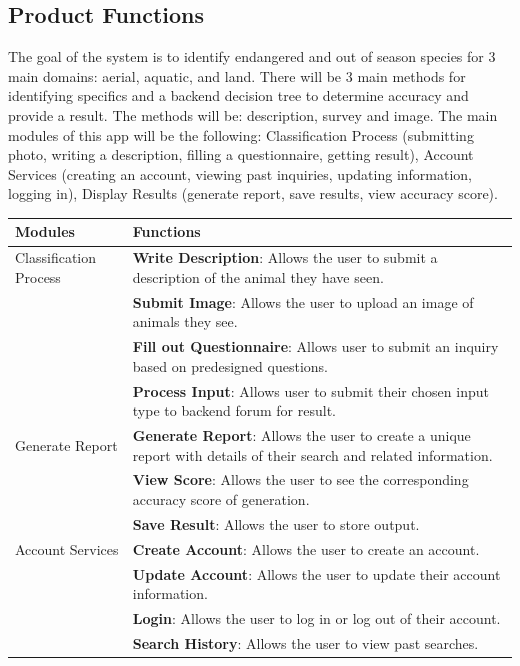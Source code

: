 \documentclass[]{article}
\begin{document}
\subsection{Product Functions}
\label{sub:product_functions}
The goal of the system is to identify endangered and out of season species for 3 main domains: aerial, aquatic, and land. There will be 3 main methods for identifying specifics and a backend decision tree to determine accuracy and provide a result. The methods will be: description, survey and image. The main modules of this app will be the following: Classification Process (submitting photo, writing a description, filling a questionnaire, getting result), Account Services (creating an account, viewing past inquiries, updating information, logging in), Display Results (generate report, save results, view accuracy score). 
\begin{center}
    \begin{tabular}{ |p{4cm}|p{10cm}| } 
    \hline
    \textbf{Modules} & \textbf{Functions} \\
    \hline
    Classification Process
    & \textbf{Write Description}: Allows the user to submit a description of the animal they have seen. \\ 
    & \textbf{Submit Image}: Allows the user to upload an image of animals they see. \\ 
    & \textbf{Fill out Questionnaire}: Allows user to submit an inquiry based on predesigned questions. \\ 
    & \textbf{Process Input}: Allows user to submit their chosen input type to backend forum for result. \\
    \hline
    Generate Report
    & \textbf{Generate Report}: Allows the user to create a unique report with details of their search and related information. \\ 
    & \textbf{View Score}: Allows the user to see the corresponding accuracy score of generation. \\
    & \textbf{Save Result}: Allows the user to store output. \\
    \hline	
    Account Services 
    & \textbf{Create Account}: Allows the user to create an account. \\ 
    & \textbf{Update Account}: Allows the user to update their account information. \\ 
    & \textbf{Login}: Allows the user to log in or log out of their account. \\ 
    & \textbf{Search History}: Allows the user to view past searches. \\
    \hline
    \end{tabular}
\end{center}
\end{document}

